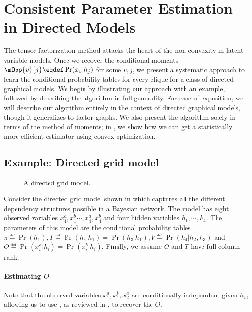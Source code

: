 \section{Consistent Parameter Estimation in Directed Models}
\label{sec:directed}

The tensor factorization method attacks the heart of the non-convexity
  in latent variable models.
  Once we recover the conditional moments $\mOpp{v}{j} \eqdef \Pr(x_v
  | h_j)$ for some $v, j$, we present a systematic approach to learn the
  conditional probability tables for every clique for a class of directed
  graphical models.
We begin by illustrating our approach with an example, followed by
  describing the algorithm in full generality.
For ease of exposition, we will describe our algorithm entirely in the
  context of directed graphical models, though it generalizes to factor
  graphs.
We also present the algorithm solely in terms of the method of moments; in
  , we show how we can get a statistically more
  efficient estimator using convex optimization.

\subsection{Example: Directed grid model}

\begin{figure}
  \centering
  
  \caption{A directed grid model.}
  \label{fig:grid}
\end{figure}

Consider the directed grid model shown in  which
  captures all the different dependency structures possible in
  a Bayesian network.
The model has eight observed variables $x^a_1, x^b_1 \cdots, x^a_4, x^b_4$ and four
  hidden variables $h_1, \cdots, h_4$.
The parameters of this model are the conditional probability tables
  $\pi \eqdef \Pr(h_1), T \eqdef \Pr(h_2 | h_1) = \Pr(h_3 | h_1),
  V \eqdef \Pr(h_4 | h_2, h_3)$ and $O \eqdef \Pr(x^a_i | h_i)
  =  \Pr(x^b_i | h_i)$. 
Finally, we assume $O$ and $T$ have full column rank.

\paragraph{Estimating $O$}
Note that the observed variables $x^a_1, x^b_1, x^a_2$ are
  conditionally independent given $h_1$, allowing us to use
  \TensorFactorize, as reviewed in , to recover
  the $O$.

